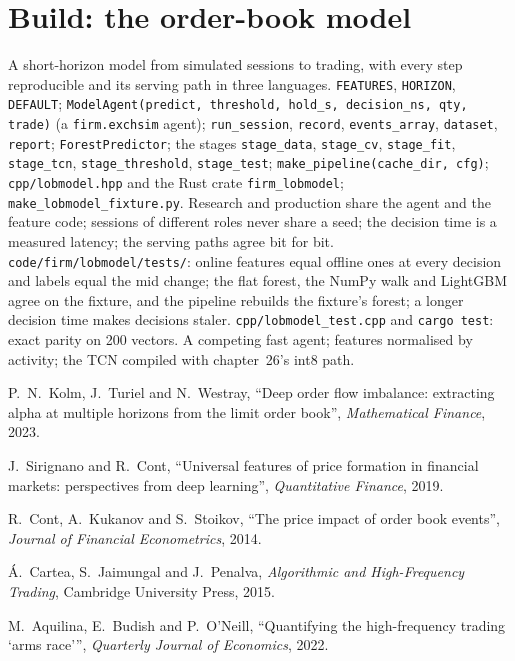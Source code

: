 \section{Build: the order-book model}\label{bld:ml:build-an-order-book-model-end-to-end:lobmodel}

\begin{build}
 A short-horizon model from simulated sessions to trading, with every step reproducible and its serving path in
three languages.
 \texttt{FEATURES}, \texttt{HORIZON}, \texttt{DEFAULT}; \texttt{ModelAgent(predict, threshold, hold\_s,
decision\_ns, qty, trade)} (a \texttt{firm.exchsim} agent); \texttt{run\_session}, \texttt{record}, \texttt{events\_array},
\texttt{dataset}, \texttt{report}; \texttt{ForestPredictor}; the stages \texttt{stage\_data}, \texttt{stage\_cv},
\texttt{stage\_fit}, \texttt{stage\_tcn}, \texttt{stage\_threshold}, \texttt{stage\_test}; \texttt{make\_pipeline(cache\_dir,
cfg)}; \texttt{cpp/lobmodel.hpp} and the Rust crate \texttt{firm\_lobmodel}; \texttt{make\_lobmodel\_fixture.py}.
 Research and production share the agent and the feature code; sessions of different roles never share a seed; the
decision time is a measured latency; the serving paths agree bit for bit.
 \texttt{code/firm/lobmodel/tests/}: online features equal offline ones at every decision and labels
equal the mid change; the flat forest, the NumPy walk and LightGBM agree on the fixture, and the pipeline rebuilds the fixture's
forest; a longer decision time makes decisions staler. \texttt{cpp/lobmodel\_test.cpp} and \texttt{cargo test}: exact parity on
200 vectors.
 A competing fast agent; features normalised by activity; the TCN compiled with chapter~26's int8 path.
\end{build}

\begin{omsources}
\item P.~N.~Kolm, J.~Turiel and N.~Westray, ``Deep order flow imbalance: extracting alpha at multiple horizons from the limit
order book'', \emph{Mathematical Finance}, 2023.
\item J.~Sirignano and R.~Cont, ``Universal features of price formation in financial markets: perspectives from deep learning'',
\emph{Quantitative Finance}, 2019.
\item R.~Cont, A.~Kukanov and S.~Stoikov, ``The price impact of order book events'', \emph{Journal of Financial Econometrics},
2014.
\item Á.~Cartea, S.~Jaimungal and J.~Penalva, \emph{Algorithmic and High-Frequency Trading}, Cambridge University Press, 2015.
\item M.~Aquilina, E.~Budish and P.~O'Neill, ``Quantifying the high-frequency trading `arms race''', \emph{Quarterly Journal of
Economics}, 2022.
\end{omsources}

